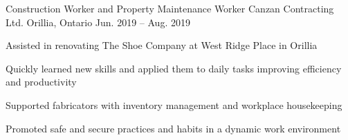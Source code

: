 \begin{cventries}
  \cventry
    {Construction Worker and Property Maintenance Worker} %
    {Canzan Contracting Ltd.} %
    {Orillia, Ontario} %
    {Jun. 2019 -- Aug. 2019} %
    {
      \begin{cvitems} %
        \item{Assisted in renovating The Shoe Company at West Ridge Place in Orillia}
        \item{Quickly learned new skills and applied them to daily tasks improving efficiency and productivity}
        \item{Supported fabricators with inventory management and workplace housekeeping}
        \item{Promoted safe and secure practices and habits in a dynamic work environment}
      \end{cvitems}
    }
\end{cventries}
